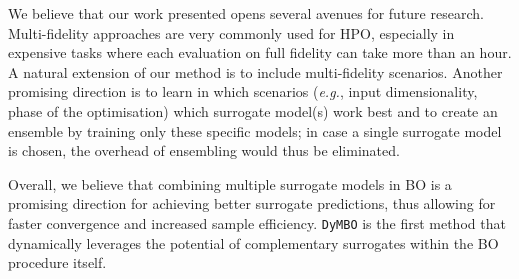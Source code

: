



We believe that our work presented opens several avenues for future research. 
Multi-fidelity approaches are very commonly used for HPO, especially in expensive tasks where each evaluation on full fidelity can take more than an hour. 
A natural extension of our method is to include multi-fidelity scenarios. 
Another promising direction is to learn in which scenarios (\emph{e.g.}, input dimensionality, phase of the optimisation) which surrogate model(s) work best and to create an ensemble by training only these specific models; 
in case a single surrogate model is chosen, the overhead of ensembling would thus be eliminated.


Overall, we believe that combining multiple surrogate models in BO is a promising direction for achieving better surrogate predictions, thus allowing for faster convergence and increased sample efficiency. 
\texttt{DyMBO} is the first method that dynamically leverages the potential of complementary surrogates within the BO procedure itself.